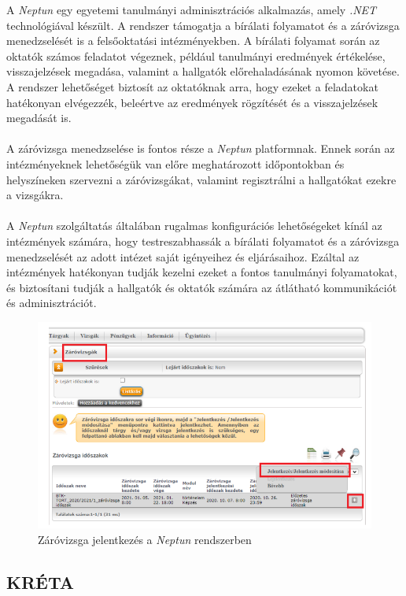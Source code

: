 A \textit{Neptun} \cite{neptun} egy egyetemi tanulmányi adminisztrációs alkalmazás, amely \textit{.NET} \cite{.NET} technológiával készült.  A rendszer támogatja a bírálati folyamatot és a záróvizsga menedzselését is a felsőoktatási intézményekben. A bírálati folyamat során az oktatók számos feladatot végeznek, például tanulmányi eredmények értékelése, visszajelzések megadása, valamint a hallgatók előrehaladásának nyomon követése. A rendszer lehetőséget biztosít az oktatóknak arra, hogy ezeket a feladatokat hatékonyan elvégezzék, beleértve az eredmények rögzítését és a visszajelzések megadását is.\\
\\
A záróvizsga menedzselése is fontos része a \textit{Neptun} platformnak. Ennek során az intézményeknek lehetőségük van előre meghatározott időpontokban és helyszíneken szervezni a záróvizsgákat, valamint regisztrálni a hallgatókat ezekre a vizsgákra.\\
\\
A \textit{Neptun} szolgáltatás általában rugalmas konfigurációs lehetőségeket kínál az intézmények számára, hogy testreszabhassák a bírálati folyamatot és a záróvizsga menedzselését az adott intézet saját igényeihez és eljárásaihoz. Ezáltal az intézmények hatékonyan tudják kezelni ezeket a fontos tanulmányi folyamatokat, és biztosítani tudják a hallgatók és oktatók számára az átlátható kommunikációt és adminisztrációt.

\begin{figure}[h]
\centering
\includegraphics[scale=0.7]{images/Neptun.png}
\caption{Záróvizsga jelentkezés a \textit{Neptun} rendszerben\cite{neptunzv}}
\label{fig:neptunzv}
\end{figure}

\newpage
\subsection{KRÉTA}

